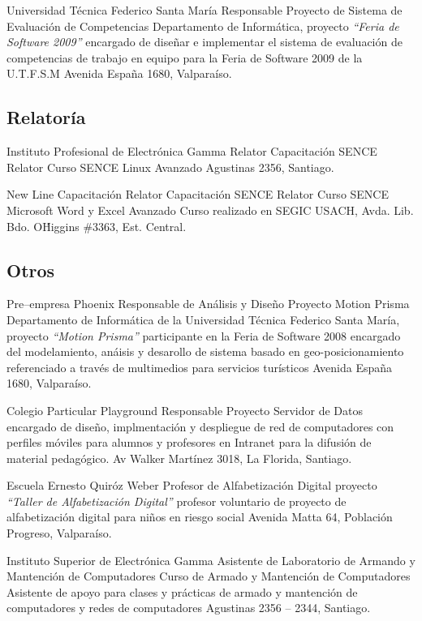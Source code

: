 	
	{Universidad T\'ecnica Federico Santa Mar\'ia}
	{Responsable Proyecto de Sistema de Evaluaci\'on de Competencias}
	{Departamento de Inform\'atica, proyecto \textit{``Feria de Software 2009''}}
	{encargado de dise\~nar e implementar el sistema de evaluaci\'on de competencias de trabajo
	 en equipo para la Feria de Software 2009 de la U.T.F.S.M}
	{Avenida Espa\~na 1680,  Valpara\'iso.}
	

\subsection{Relatoría}
	
	{Instituto Profesional de Electrónica Gamma} %
	{Relator} %
	{Capacitación SENCE} %
	{Relator Curso SENCE Linux Avanzado}
    {Agustinas 2356, Santiago.}
	
	{New Line Capacitación} %
	{Relator} %
	{Capacitación SENCE} %
	{Relator Curso SENCE Microsoft  Word y Excel Avanzado}
	{Curso realizado en SEGIC USACH, Avda. Lib. Bdo. O\'Higgins \#3363, Est.
    Central.}
	

	

	
	
\subsection{Otros}
	{Pre--empresa Phoenix}
	{Responsable de An\'alisis y Dise\~no Proyecto Motion Prisma}
	{Departamento de Inform\'atica de la Universidad T\'ecnica Federico Santa Mar\'ia, proyecto
	\textit{ ``Motion Prisma''} 	participante en la Feria de Software 2008}
	{encargado del modelamiento, an\'aisis y desarollo de sistema basado en geo-posicionamiento 
	referenciado a trav\'es de multimedios para servicios tur\'isticos}
	{Avenida Espa\~na 1680, Valpara\'iso.}
	
	{Colegio Particular Playground}
	{Responsable Proyecto Servidor de Datos}
	{}
	{encargado de dise\~no, implmentaci\'on y despliegue de red de computadores con perfiles 
	m\'oviles para alumnos y profesores en Intranet para la difusi\'on de material pedag\'ogico.}
	{Av Walker Mart\'inez 3018, La Florida, Santiago.}


	{Escuela Ernesto Quir\'oz Weber}
	{Profesor de Alfabetizaci\'on Digital}
	{proyecto \textit{``Taller de Alfabetizaci\'on Digital''}}
	{profesor voluntario de proyecto de alfabetizaci\'on digital para ni\~nos en riesgo social}
	{Avenida Matta 64, Poblaci\'on Progreso, Valpara\'iso.}
 

	{Instituto Superior de Electr\'onica Gamma}
	{Asistente de Laboratorio de Armando y Mantenci\'on de Computadores}
	{Curso de Armado y Mantenci\'on de Computadores}
	{Asistente de apoyo para clases y pr\'acticas de armado y mantenci\'on de computadores y 
	redes de computadores}
	{Agustinas 2356 -- 2344, Santiago.}

